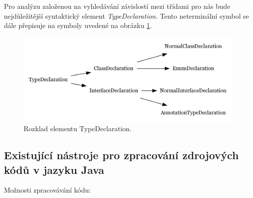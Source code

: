 Pro analýzu založenou na vyhledávání závislostí mezi třídami pro nás bude nejdůležitější syntaktický element \emph{TypeDeclaration}. Tento neterminální symbol se dále přepisuje na symboly uvedené na obrázku \ref{type_declaration_options}.

\begin{figure}[h!]
  \centering
  \includegraphics[width=\textwidth]{./graphs/toplevel_types.png}
  \caption{Rozklad elementu TypeDeclaration.\label{type_declaration_options}}
\end{figure}








\subsection{Existující nástroje pro zpracování zdrojových kódů v jazyku Java}


Možnosti zpracovávání kódu:


